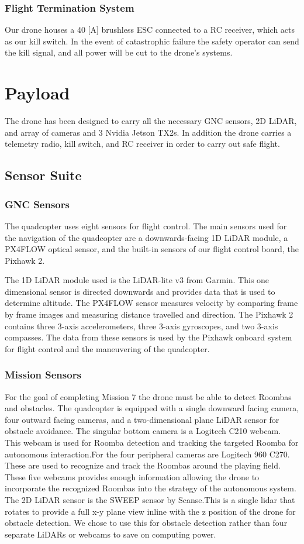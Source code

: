 \documentclass[12pt,letterpaper]{article}
\begin{document}
		\subsubsection*{Flight Termination System}
			Our drone houses a 40 [A] brushless ESC connected to a RC receiver, which acts as our kill switch. In the event of catastrophic failure the safety operator can send the kill signal, and all power will be cut to the drone's systems.


\section*{Payload}
	The drone has been designed to carry all the necessary GNC sensors, 2D LiDAR, and array of cameras and 3 Nvidia Jetson TX2s. In addition the drone carries a telemetry radio, kill switch, and RC receiver in order to carry out safe flight.
	\subsection*{Sensor Suite}
		\subsubsection*{GNC Sensors}
			The quadcopter uses eight sensors for flight control. The main sensors used for the navigation of the quadcopter are a downwards-facing 1D LiDAR module, a PX4FLOW optical sensor, and the built-in sensors of our flight control board, the Pixhawk 2.

			The 1D LiDAR module used is the LiDAR-lite v3 from Garmin. This one dimensional sensor is directed downwards and provides data that is used to determine altitude. The PX4FLOW sensor measures velocity by comparing frame by frame images and measuring distance travelled and direction. The Pixhawk 2 contains three 3-axis accelerometers, three 3-axis gyroscopes, and two 3-axis compasses. The data from these sensors is used by the Pixhawk onboard system for flight control and the maneuvering of the quadcopter.

		\subsubsection*{Mission Sensors}
			For the goal of completing Mission 7 the drone must be able to detect Roombas and obstacles. The quadcopter is equipped with a single downward facing camera, four outward facing cameras, and a two-dimensional plane LiDAR sensor for obstacle avoidance.
			The singular bottom camera is a Logitech C210 webcam. This webcam is used for Roomba detection and tracking the targeted Roomba for autonomous interaction.For the four peripheral cameras are Logitech 960 C270. These are used to recognize and track the Roombas around the playing field. These five webcams provides enough information allowing the drone to incorporate the recognized Roombas into the strategy of the autonomous system.
			The 2D LiDAR sensor is the SWEEP sensor by Scanse.This is a single lidar that rotates to provide a full x-y plane view inline with the z position of the drone for obstacle detection. We chose to use this for obstacle detection rather than four separate LiDARs or webcams to save on computing power.
\end{document}
